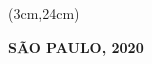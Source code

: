 \begin{titlepage}
\begin{textblock*}{15cm}
\begin{LARGE}
        \end{LARGE}
        
    \end{textblock*}
    
    \begin{textblock*}{15cm}(3cm,24cm)
        \makeatletter
        \begin{center}
            {\color{black}
                \textbf{SÃO PAULO, 2020} 
            }
        \end{center}
        \makeatother
    \end{textblock*}

\end{titlepage}
